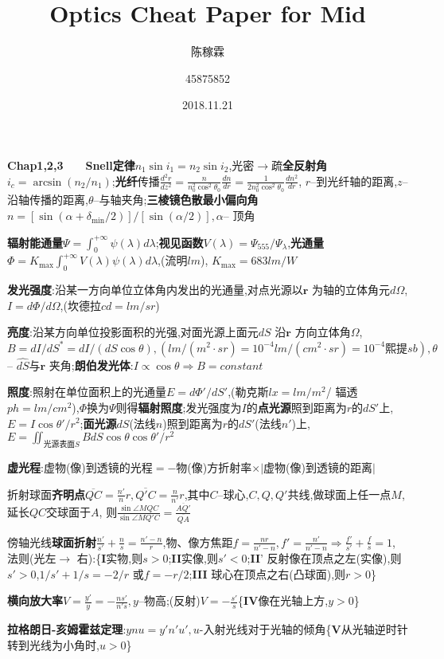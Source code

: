 \documentclass[10pt,a4paper]{article}
\title{Optics Cheat Paper for Mid}
\author{陈稼霖 \and 45875852}
\date{2018.11.21}
\begin{document}
\tiny
\textbf{Chap1,2,3}~~~~\textbf{Snell定律}$n_1\sin i_1=n_2\sin i_2$,光密$\to$疏\textbf{全反射角}$i_c=\arcsin(n_2/n_1)$;\textbf{光纤}传播$\frac{d^2r}{dz^2}=\frac{n}{n_0^2\cos^2\theta_0}\frac{dn}{dr}=\frac{1}{2n_0^2\cos^2\theta_0}\frac{dn^2}{dr}$, $r$--到光纤轴的距离,$z$-- 沿轴传播的距离,$\theta$--与轴夹角;\textbf{三棱镜色散最小偏向角}$n=[\sin(\alpha+\delta_{\min}/2)]/[\sin(\alpha/2)],\alpha$-- 顶角

\textbf{辐射能通量}$\Psi=\int_0^{+\infty}\psi(\lambda)d\lambda$;\textbf{视见函数}$V(\lambda)=\Psi_{555}/\Psi_\lambda$,\textbf{光通量}$\Phi=K_{\max}\int_0^{+\infty}V(\lambda)\psi(\lambda)d\lambda$,(流明$lm$), $K_{\max}=683lm/W$

\textbf{发光强度}:沿某一方向单位立体角内发出的光通量,对点光源以$\bm{r}$ 为轴的立体角元$d\Omega$,$I=d\Phi/d\Omega$,(坎德拉$cd=lm/sr$)

\textbf{亮度}:沿某方向单位投影面积的光强,对面光源上面元$dS$ 沿$\bm{r}$ 方向立体角$\Omega$,$B=dI/dS^*=dI/(dS\cos\theta),(lm/(m^2\cdot sr)=10^{-4}lm/(cm^2\cdot sr)=10^{-4}\text{熙提}sb),\theta$-- $\hat{dS}$与$\bm{r}$ 夹角;\textbf{朗伯发光体}:$I\propto\cos\theta\Longrightarrow B=constant$

\textbf{照度}:照射在单位面积上的光通量$E=d\Phi'/dS'$,(勒克斯$lx=lm/m^2$/ 辐透$ph=lm/cm^2$),$\Phi$换为$\Psi$则得\textbf{辐射照度};发光强度为$I$的\textbf{点光源}照到距离为$r$的$dS'$上,$E=I\cos\theta'/r^2$;\textbf{面光源}$dS$(法线$n$)照到距离为$r$的$dS'$(法线$n'$)上,$E=\iint_{\text{光源表面}S}BdS\cos\theta\cos\theta'/r^2$

\textbf{虚光程}:虚物(像)到透镜的光程$=-$物(像)方折射率$\times|$虚物(像)到透镜的距离$|$

折射球面\textbf{齐明点}$\overline{QC}=\frac{n'}{n}r,\overline{Q'C}=\frac{n}{n'}r$,其中$C$--球心,$C,Q,Q'$共线,做球面上任一点$M$,延长$QC$交球面于$A$, 则$\frac{\sin\angle MQC}{\sin\angle MQ'C}=\frac{\overline{AQ'}}{\overline{QA}}$

傍轴光线\textbf{球面折射}$\frac{n'}{s'}+\frac{n}{s}=\frac{n'-n}{r}$,物、像方焦距$f=\frac{nr}{n'-n},f'=\frac{n'}{n'-n}\Longrightarrow\frac{f'}{s'}+\frac{f}{s}=1$, 法则(光左$\to$ 右):\{\textbf{I}实物,则$s>0$;\textbf{II}实像,则$s'<0$;\textbf{II}' 反射像在顶点之左(实像),则$s'>0$,$1/s'+1/s=-2/r$ 或$f=-r/2$;\textbf{III} 球心在顶点之右(凸球面),则$r>0$\}

\textbf{横向放大率}$V=\frac{y'}{y}=-\frac{ns'}{n's},y$--物高;(反射)$V=-\frac{s'}{s}$\{\textbf{IV}像在光轴上方,$y>0$\}

\textbf{拉格朗日-亥姆霍兹定理}:$ynu=y'n'u',u$-入射光线对于光轴的倾角\{\textbf{V}从光轴逆时针转到光线为小角时,$u>0$\}
\end{document}

